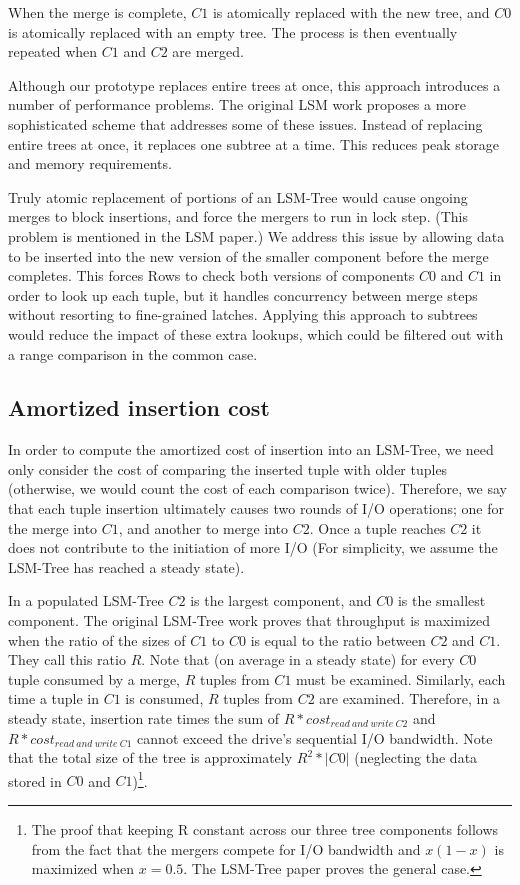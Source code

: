 \documentclass{sig-alternate-sigmod08}
\newcommand{\rows}{Rows\xspace}
\begin{document}
When the merge is complete, $C1$ is atomically replaced
with the new tree, and $C0$ is atomically replaced with an empty tree.
The process is then eventually repeated when $C1$ and $C2$ are merged.

Although our prototype replaces entire trees at once, this approach
introduces a number of performance problems.  The original LSM work
proposes a more sophisticated scheme that addresses some of these
issues.  Instead of replacing entire trees at once, it replaces one
subtree at a time.  This reduces peak storage and memory requirements.

Truly atomic replacement of portions of an LSM-Tree would cause ongoing
merges to block insertions, and force the mergers to run in lock step.
(This problem is mentioned in the LSM
paper.)  We address this issue by allowing data to be inserted into
the new version of the smaller component before the merge completes.
This forces \rows to check both versions of components $C0$ and $C1$
in order to look up each tuple, but it handles concurrency between merge steps
without resorting to fine-grained latches.  Applying this
approach to subtrees would reduce the impact of these extra lookups,
which could be filtered out with a range comparison in the common
case.

\subsection{Amortized insertion cost}

In order to compute the amortized cost of insertion into an LSM-Tree,
we need only consider the cost of comparing the inserted tuple with
older tuples (otherwise, we would count the cost of each comparison
twice).  Therefore, we say that each tuple insertion ultimately causes
two rounds of I/O operations; one for the merge into $C1$, and another
to merge into $C2$.  Once a tuple reaches $C2$ it does not contribute
to the initiation of more I/O (For simplicity, we assume the LSM-Tree
has reached a steady state).

In a populated LSM-Tree $C2$ is the largest component, and $C0$ is the
smallest component.  The original LSM-Tree work proves that throughput
is maximized when the ratio of the sizes of $C1$ to $C0$ is equal to
the ratio between $C2$ and $C1$.  They call this ratio $R$.  Note that
(on average in a steady state) for every $C0$ tuple consumed by a
merge, $R$ tuples from $C1$ must be examined.  Similarly, each time a
tuple in $C1$ is consumed, $R$ tuples from $C2$ are examined.
Therefore, in a steady state, insertion rate times the sum of $R *
cost_{read~and~write~C2}$ and $R * cost_{read~and~write~C1}$ cannot
exceed the drive's sequential I/O bandwidth.  Note that the total size
of the tree is approximately $R^2 * |C0|$ (neglecting the data stored
in $C0$ and $C1$)\footnote{The proof that keeping R constant across
  our three tree components follows from the fact that the mergers
  compete for I/O bandwidth and $x(1-x)$ is maximized when $x=0.5$.
  The LSM-Tree paper proves the general case.}.
\end{document}
